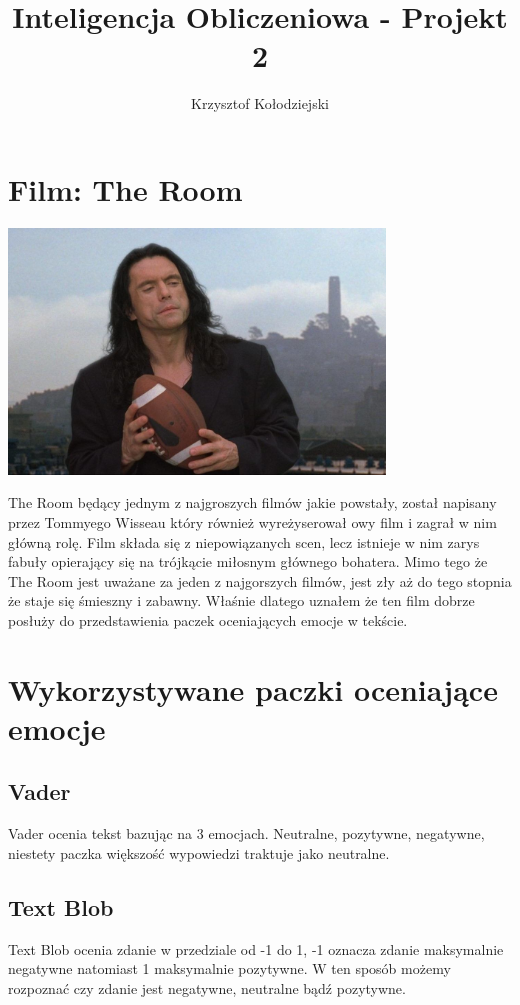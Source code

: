 \documentclass[a4paper,12pt]{article}
\title{Inteligencja Obliczeniowa - Projekt 2}
\author{Krzysztof Kołodziejski}
\begin{document}
	\maketitle
	\section {Film: The Room}
	\begin{center}
		{\includegraphics[width=10cm]{johnny.jpg}}\\
	\end{center}
	The Room będący jednym z najgroszych filmów jakie powstały, został napisany przez Tommyego Wisseau który również wyreżyserował owy film i zagrał w nim główną rolę.
	Film składa się z niepowiązanych scen, lecz istnieje w nim zarys fabuły opierający się na trójkącie miłosnym głównego bohatera.
	Mimo tego że The Room jest uważane za jeden z najgorszych filmów, jest zły aż do tego stopnia że staje się śmieszny i zabawny. Właśnie dlatego uznałem że ten film dobrze posłuży do przedstawienia paczek oceniających emocje w tekście.
	\clearpage
	\section {Wykorzystywane paczki oceniające emocje}
	\subsection{Vader}
	Vader ocenia tekst bazując na 3 emocjach. Neutralne, pozytywne, negatywne, niestety paczka większość wypowiedzi traktuje jako neutralne.
	\subsection{Text Blob}
	Text Blob ocenia zdanie w przedziale od -1 do 1, -1 oznacza zdanie maksymalnie negatywne natomiast 1 maksymalnie pozytywne. W ten sposób możemy rozpoznać czy zdanie jest negatywne, neutralne bądź pozytywne.
\end{document}
